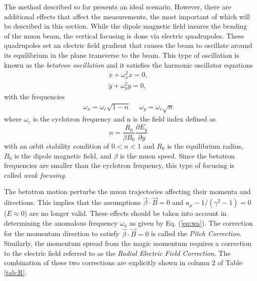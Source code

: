 \documentclass{outhesis}
\begin{document}
The method described so far presents an ideal scenario. However, there are additional effects that affect the measurements, the most important of which will be described in this section.  
While the dipole magnetic field insures the bending of the muon beam, the vertical focusing is done via electric quadrupoles. These quadrupoles set an electric field gradient that causes the beam to oscillate around its equilibrium in the plane transverse to the beam. This type of oscillation is known as the \emph{betatron oscillation} and it satisfies the harmonic oscillator equations 
\begin{equation}
\begin{split}
\ddot{x} + \omega_x^2 x = 0, \\
\ddot{y} + \omega_y^2 y = 0,
\end{split}
\end{equation}
with the frequencies 
\begin{equation}
\begin{split}
\omega_x = \omega_c\sqrt{1-n} \,\,\,\,\,\,\,\,
\omega_y = \omega_c\sqrt{n}
\end{split}
\end{equation}
where $ \omega_c$ is the cyclotron frequency and n is the field index defined as 
\begin{equation}
n = \frac{R_0}{\beta B_0}\frac{\partial E_y}{\partial y}
\end{equation}
with an orbit stability condition of $0<n<1$ and $R_0$ is the equilibrium radius, $B_0$ is the dipole magnetic field, and $\beta$ is the muon speed. Since the betatron frequencies are smaller than the cyclotron frequency, this type of focusing is called \emph{weak focusing}.
 
The betatron motion perturbs the muon trajectories affecting their momenta and directions. This implies that the assumptions $\overrightarrow{\beta} \cdot \overrightarrow{B} = 0$ and $a_{\mu} -1/\left(\gamma^2-1\right) = 0$ ($E \approx 0$) are no longer valid. These effects should be taken into account in determining the anomalous frequency $\omega_a$ as given by Eq. (\ref{eq:wa}). The correction for the momentum direction to satisfy $\overrightarrow{\beta} \cdot \overrightarrow{B} = 0$ is called the \emph{Pitch Correction}. Similarly, the momentum spread from the magic momentum requires a correction to the electric field referred to as the \emph{Radial Electric Field Correction}. The combination of these two corrections are explicitly shown in column 2 of Table \ref{tab:R}. 
\end{document}
